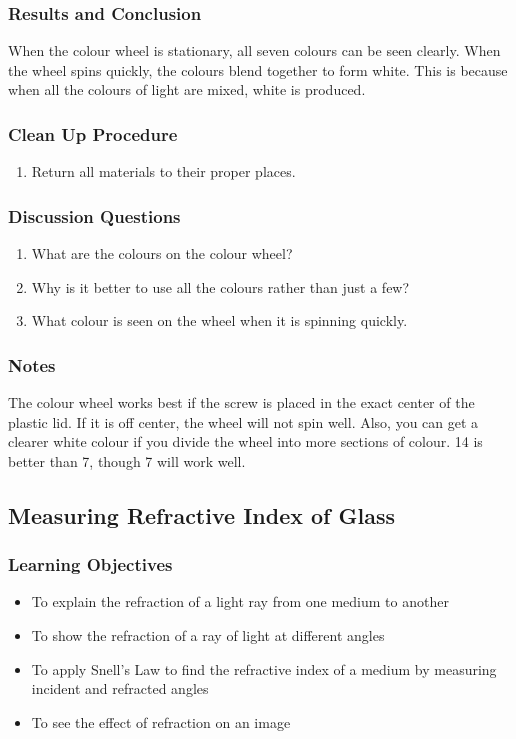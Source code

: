 \subsubsection*{Results and Conclusion}
When the colour wheel is stationary, all seven colours can be seen clearly. When the wheel spins quickly, the colours blend together to form white. This is because when all the colours of light are mixed, white is produced.  

\subsubsection*{Clean Up Procedure}
\begin{enumerate}
\item{Return all materials to their proper places.} 
\end{enumerate}

\subsubsection*{Discussion Questions}
\begin{enumerate}
\item{What are the colours on the colour wheel?}
\item{Why is it better to use all the colours rather than just a few?}
\item{What colour is seen on the wheel when it is spinning quickly.} 
\end{enumerate}

\subsubsection*{Notes}
The colour wheel works best if the screw is placed in the exact center of the plastic lid. If it is off center, the wheel will not spin well. Also, you can get a clearer white colour if you divide the wheel into more sections of colour. 14 is better than 7, though 7 will work well.  



\subsection{Measuring Refractive Index of Glass}

\subsubsection*{Learning Objectives}
\begin{itemize}
\item{To explain the refraction of a light ray from one medium to another} 
\item{To show the refraction of a ray of light at different angles} 
\item{To apply Snell's Law to find the refractive index of a medium by measuring incident and refracted angles} 
\item{To see the effect of refraction on an image} 
\end{itemize}

